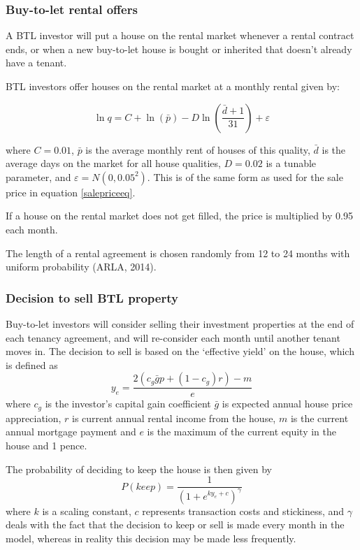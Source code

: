 \documentclass{report}
\begin{document}
\subsubsection{Buy-to-let rental offers}
A BTL investor will put a house on the rental market whenever a rental contract ends, or when a new buy-to-let house is bought or inherited that doesn't already have a tenant.

BTL investors offer houses on the rental market at a monthly rental given by:

\begin{equation}
\ln q=C+\ln (\bar{p})-D\ln \left( \frac{\bar{d}+1}{31}\right) +\varepsilon
\end{equation}

where $C=0.01$, $\bar{p}$ is the average monthly rent of houses of this quality, $\bar{d}$ is the average days on the market for all house qualities, $D=0.02$ is a tunable parameter, and $\varepsilon=N(0,0.05^{2})$. This is of the same form as used for the sale price in equation \ref{salepriceeq}.

If a house on the rental market does not get filled, the price is multiplied by 0.95 each month.

The length of a rental agreement is chosen randomly from 12 to 24 months with uniform probability (ARLA, 2014).

\subsubsection{Decision to sell BTL property}
\label{sellbtl}
Buy-to-let investors will consider selling their investment properties at the end of each tenancy agreement, and will re-consider each month until another tenant moves in. The decision to sell is based on the `effective yield' on the house, which is defined as
\begin{equation}
y_e = \frac{2(c_g \bar{g}p + (1-c_g)r) - m}{e} 
\end{equation}
where $c_g$ is the investor's capital gain coefficient $\bar{g}$ is expected annual house price appreciation, $r$ is current annual rental income from the house, $m$ is the current annual mortgage payment and $e$ is the maximum of the current equity in the house and 1 pence.

The probability of deciding to keep the house is then given by
\begin{equation}
P(keep) = \frac{1}{(1 + e^{ky_e+c})^\gamma}
\end{equation}
where $k$ is a scaling constant, $c$ represents transaction costs and stickiness, and $\gamma$ deals with the fact that the decision to keep or sell is made every month in the model, whereas in reality this decision may be made less frequently.
\end{document}
